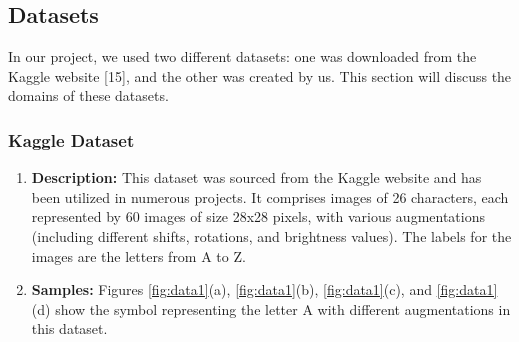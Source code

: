\subsection{Datasets}
In our project, we used two different datasets: one was downloaded from the Kaggle website [15], and the other was created by us. This section will discuss the domains of these datasets.
\subsubsection{Kaggle Dataset}
\begin{enumerate}
    \item \textbf{Description:} 
    This dataset was sourced from the Kaggle website and has been utilized in numerous projects. It comprises images of 26 characters, each represented by 60 images of size 28x28 pixels, with various augmentations (including different shifts, rotations, and brightness values). The labels for the images are the letters from A to Z.
    \item \textbf{Samples:}
    Figures \ref{fig:data1}(a), \ref{fig:data1}(b), \ref{fig:data1}(c), and \ref{fig:data1}(d) show the symbol representing the letter A with different augmentations in this dataset.


\end{enumerate}
